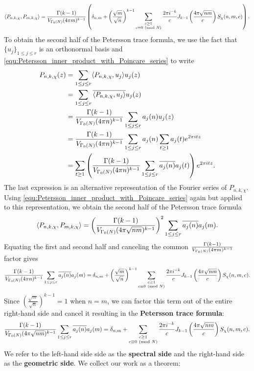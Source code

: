     \[
      \langle P_{n,k,\chi},P_{m,k,\chi}\rangle = \frac{\Gamma(k-1)}{V_{\Gamma_{0}(N)}(4\pi m)^{k-1}}\left(\delta_{n,m}+\left(\frac{\sqrt{m}}{\sqrt{n}}\right)^{k-1}\sum_{\substack{c \ge 1 \\ c \equiv 0 \ \left(\text{mod }N\right)}}\frac{2\pi i^{-k}}{c}J_{k-1}\left(\frac{4\pi\sqrt{nm}}{c}\right)S_{\chi}(n,m,c)\right).
    \]
    To obtain the second half of the Petersson trace formula, we use the fact that $\{u_{j}\}_{1 \le j \le r}$ is an orthonormal basis and \cref{equ:Petersson_inner_product_with_Poincare_series} to write
    \begin{align*}
      P_{n,k,\chi}(z) &= \sum_{1 \le j \le r}\langle P_{n,k,\chi},u_{j}\rangle u_{j}(z) \\
      &= \sum_{1 \le j \le r}\overline{\langle P_{n,k,\chi},u_{j}\rangle}u_{j}(z) \\
      &= \frac{\Gamma(k-1)}{V_{\Gamma_{0}(N)}(4\pi n)^{k-1}}\sum_{1 \le j \le r}a_{j}(n)u_{j}(z) \\
      &= \frac{\Gamma(k-1)}{V_{\Gamma_{0}(N)}(4\pi n)^{k-1}}\sum_{1 \le j \le r}a_{j}(n)\sum_{t \ge 1}a_{j}(t)e^{2\pi itz} \\
      &= \sum_{t \ge 1}\left(\frac{\Gamma(k-1)}{V_{\Gamma_{0}(N)}(4\pi n)^{k-1}}\sum_{1 \le j \le r}\overline{a_{j}(n)}a_{j}(t)\right)e^{2\pi itz}.
    \end{align*}
    The last expression is an alternative representation of the Fourier series of $P_{n,k,\chi}$. Using \cref{equ:Petersson_inner_product_with_Poincare_series} again but applied to this representation, we obtain the second half of the Petersson trace formula
    \[
      \langle P_{n,k,\chi},P_{m,k,\chi}\rangle = \left(\frac{\Gamma(k-1)}{V_{\Gamma_{0}(N)}(4\pi \sqrt{nm})^{k-1}}\right)^{2}\sum_{1 \le j \le r}\overline{a_{j}(n)}a_{j}(m).
    \]
    Equating the first and second half and canceling the common $\frac{\Gamma(k-1)}{V_{\Gamma_{0}(N)}(4\pi m)^{k-1}}$ factor gives
    \[
      \frac{\Gamma(k-1)}{V_{\Gamma_{0}(N)}(4\pi n)^{k-1}}\sum_{1 \le j \le r}\overline{a_{j}(n)}a_{j}(m) = \delta_{n,m}+\left(\frac{\sqrt{m}}{\sqrt{n}}\right)^{k-1}\sum_{\substack{c \ge 1 \\ c \equiv 0 \ \left(\text{mod }N\right)}}\frac{2\pi i^{-k}}{c}J_{k-1}\left(\frac{4\pi\sqrt{nm}}{c}\right)S_{\chi}(n,m,c).
    \]
    Since $\left(\frac{\sqrt{m}}{\sqrt{n}}\right)^{k-1} = 1$ when $n = m$, we can factor this term out of the entire right-hand side and cancel it resulting in the \textbf{Petersson trace formula}:
    \[
      \frac{\Gamma(k-1)}{V_{\Gamma_{0}(N)}(4\pi\sqrt{nm})^{k-1}}\sum_{1 \le j \le r}\overline{a_{j}(n)}a_{j}(m) = \delta_{n,m}+\sum_{\substack{c \ge 1 \\ c \equiv 0 \ \left(\text{mod }N\right)}}\frac{2\pi i^{-k}}{c}J_{k-1}\left(\frac{4\pi\sqrt{nm}}{c}\right)S_{\chi}(n,m,c).
    \]
    We refer to the left-hand side side as the \textbf{spectral side} and the right-hand side as the \textbf{geometric side}. We collect our work as a theorem:

